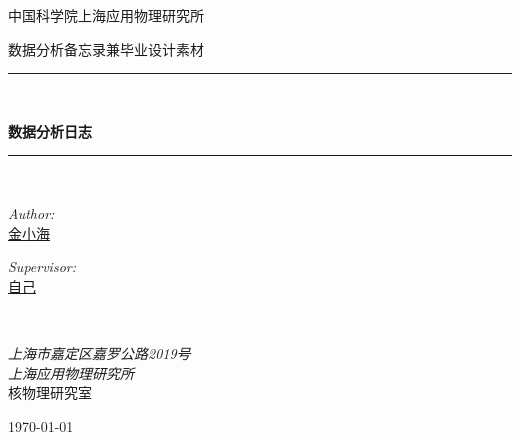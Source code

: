 \begin{titlepage}
\begin{center}

\vspace*{0.06\textheight}
{\scshape\LARGE 中国科学院上海应用物理研究所\par}\vspace{1.5cm} %
\textsc{\large 数据分析备忘录兼毕业设计素材}\\[0.5cm] %

\rule{\textwidth}{1pt} \\[0.4cm] %
{\huge \bfseries 数据分析日志\par}\vspace{0.4cm} %
\rule{\textwidth}{1pt} \\[1.5cm] %

\begin{minipage}[t]{0.4\textwidth}
\begin{flushleft} \large
\emph{Author:}\\
\href{http://www.jinxiaohai.cn}{金小海}
\end{flushleft}
\end{minipage}
\begin{minipage}[t]{0.4\textwidth}
\begin{flushright} \large
\emph{Supervisor:} \\
\href{http://www.jinxiaohai.cn}{自己}
\end{flushright}
\end{minipage}\\[3cm]

\vfill

\large \textit{上海市嘉定区嘉罗公路2019号\\ 上海应用物理研究所 }\\[0.3cm] %
核物理研究室\\[2cm] %

\vfill

{\large \today}\\[4cm] %

\vfill
\end{center}
\end{titlepage}




